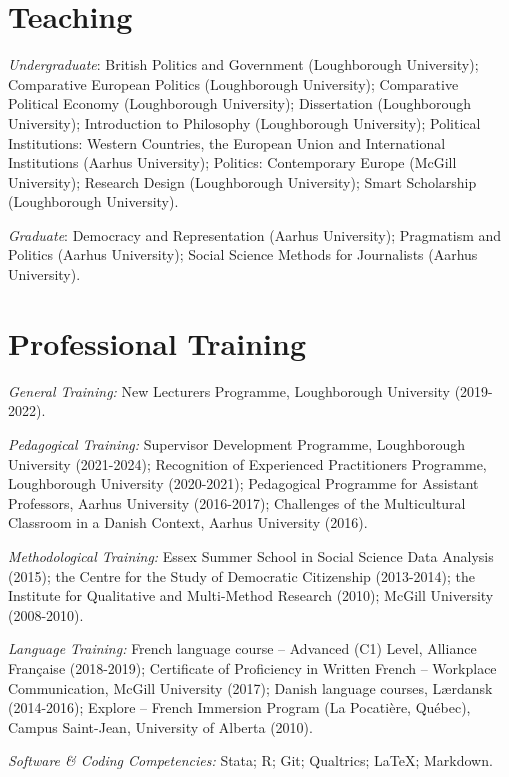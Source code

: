 \documentclass[letterpaper,fontsize=10.5pt]{scrartcl}
\begin{document}
\section{Teaching}
{}\textit{Undergraduate}: British Politics and Government (Loughborough University); Comparative European Politics (Loughborough University); Comparative Political Economy (Loughborough University); Dissertation (Loughborough University); Introduction to Philosophy (Loughborough University); Political Institutions: Western Countries, the European Union and International Institutions (Aarhus University); Politics: Contemporary Europe (McGill University); Research Design (Loughborough University); Smart Scholarship (Loughborough University).\\
\hfill \break
{}
{}\textit{Graduate}: Democracy and Representation (Aarhus University); Pragmatism and Politics (Aarhus University); Social Science Methods for Journalists (Aarhus University).

\section{Professional Training}
{}\textit{General Training:} New Lecturers Programme, Loughborough University (2019-2022).\\
\hfill \break
{}
{}\textit{Pedagogical Training:} Supervisor Development Programme, Loughborough University (2021-2024); Recognition of Experienced Practitioners Programme, Loughborough University (2020-2021); Pedagogical Programme for Assistant Professors, Aarhus University (2016-2017); Challenges of the Multicultural Classroom in a Danish Context, Aarhus University (2016).\\
\hfill \break
{}
{}\textit{Methodological Training:} Essex Summer School in Social Science Data Analysis (2015); the Centre for the Study of Democratic Citizenship (2013-2014); the Institute for Qualitative and Multi-Method Research (2010); McGill University (2008-2010).\\
\hfill \break
{}
{}\textit{Language Training:} French language course – Advanced (C1) Level, Alliance Française (2018-2019); Certificate of Proficiency in Written French – Workplace Communication, McGill University (2017); Danish language courses, Lærdansk (2014-2016); Explore – French Immersion Program (La Pocatière, Québec), Campus Saint-Jean, University of Alberta (2010).\\
\hfill \break
{}
{}\textit{Software \& Coding Competencies:} Stata; R; Git; Qualtrics; \LaTeX ; Markdown.
\end{document}
